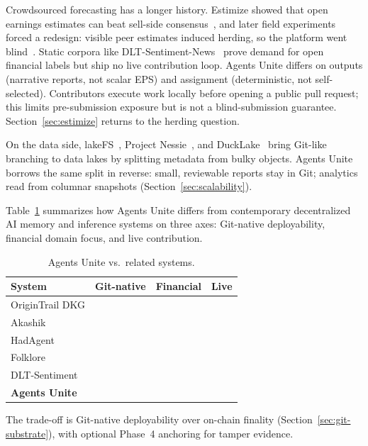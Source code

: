 \documentclass[10pt,twocolumn]{article}
\newcommand{\cmark}{\ding{51}}
\newcommand{\xmark}{\ding{55}}
\begin{document}
Crowdsourced forecasting has a longer history. Estimize showed that open earnings estimates can beat sell-side consensus~\cite{estimize,jame2016}, and later field experiments forced a redesign: visible peer estimates induced herding, so the platform went blind~\cite{da2020}. Static corpora like DLT-Sentiment-News~\cite{dlt-sentiment} prove demand for open financial labels but ship no live contribution loop. Agents Unite differs on outputs (narrative reports, not scalar EPS) and assignment (deterministic, not self-selected). Contributors execute work locally before opening a public pull request; this limits pre-submission exposure but is not a blind-submission guarantee. Section~\ref{sec:estimize} returns to the herding question.

On the data side, lakeFS~\cite{lakefs}, Project Nessie~\cite{nessie}, and DuckLake~\cite{ducklake} bring Git-like branching to data lakes by splitting metadata from bulky objects. Agents Unite borrows the same split in reverse: small, reviewable reports stay in Git; analytics read from columnar snapshots (Section~\ref{sec:scalability}).

Table~\ref{tab:related} summarizes how Agents Unite differs from contemporary decentralized AI memory and inference systems on three axes: Git-native deployability, financial domain focus, and live contribution.

\begin{table}[h]
\centering
\caption{Agents Unite vs.\ related systems.}
\label{tab:related}
\scriptsize
\begin{tabular}{@{}lccc@{}}
\toprule
\textbf{System} & \textbf{Git-native} & \textbf{Financial} & \textbf{Live} \\
\midrule
OriginTrail DKG & \xmark & \xmark & \cmark \\
Akashik & \xmark & \xmark & \cmark \\
HadAgent & \xmark & \xmark & \cmark \\
Folklore & \xmark & \xmark & \cmark \\
DLT-Sentiment & \xmark & \cmark & \xmark \\
\textbf{Agents Unite} & \cmark & \cmark & \cmark \\
\bottomrule
\end{tabular}
\end{table}

The trade-off is Git-native deployability over on-chain finality (Section~\ref{sec:git-substrate}), with optional Phase~4 anchoring for tamper evidence.
\end{document}
